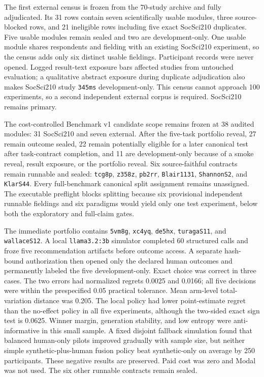 \documentclass[11pt]{article}
\begin{document}
The first external census is frozen from the 70-study archive and fully adjudicated. Its 31 rows contain seven scientifically usable modules, three source-blocked rows, and 21 ineligible rows including five exact SocSci210 duplicates. Five usable modules remain sealed and two are development-only. One usable module shares respondents and fielding with an existing SocSci210 experiment, so the census adds only six distinct usable fieldings. Participant records were never opened. Logged result-text exposure bars affected studies from untouched evaluation; a qualitative abstract exposure during duplicate adjudication also makes SocSci210 study \texttt{345ms} development-only. This census cannot approach 100 experiments, so a second independent external corpus is required. SocSci210 remains primary.

The cost-controlled Benchmark v1 candidate scope remains frozen at 38 audited modules: 31 SocSci210 and seven external. After the five-task portfolio reveal, 27 remain outcome sealed, 22 remain potentially eligible for a later canonical test after task-contract completion, and 11 are development-only because of a smoke reveal, result exposure, or the portfolio reveal. Six source-faithful contracts remain runnable and sealed: \texttt{tcg8p}, \texttt{z358z}, \texttt{pb2rr}, \texttt{Blair1131}, \texttt{ShannonS2}, and \texttt{KlarS44}. Every full-benchmark canonical split assignment remains unassigned. The executable preflight blocks splitting because six provisional independent runnable fieldings and six paradigms would yield only one test experiment, below both the exploratory and full-claim gates.

The immediate portfolio contains \texttt{5vm8g}, \texttt{xc4yq}, \texttt{de5hx}, \texttt{turagaS11}, and \texttt{wallaceS12}. A local \texttt{llama3.2:3b} simulator completed 60 structured calls and froze five recommendation artifacts before outcome access. A separate hash-bound authorization then opened only the declared human outcomes and permanently labeled the five development-only. Exact choice was correct in three cases. The two errors had normalized regrets 0.0025 and 0.0166; all five decisions were within the prespecified 0.05 practical tolerance. Mean arm-level total-variation distance was 0.205. The local policy had lower point-estimate regret than the no-effect policy in all five experiments, although the two-sided exact sign test is 0.0625. Winner margin, generation stability, and low entropy were anti-informative in this small sample. A fixed disjoint fallback simulation found that balanced human-only pilots improved gradually with sample size, but neither simple synthetic-plus-human fusion policy beat synthetic-only on average by 250 participants. These negative results are preserved. Paid cost was zero and Modal was not used. The six other runnable contracts remain sealed.
\end{document}
